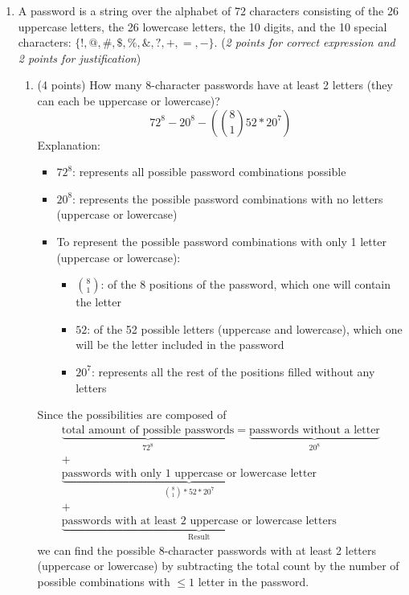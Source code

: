 \documentclass[10pt,letterpaper,unboxed,cm]{article}
\begin{document}
\begin{enumerate}
\item
A password is a string over the alphabet of 72 characters consisting of the 26 uppercase letters, the 26 lowercase letters, the 10 digits, and the 10 special characters: $\{!,@,\#,\$,\%,\&,?,+,=,-\}$. (\emph{2 points for correct expression and 2 points for justification})

\begin{enumerate}


\item
(4 points)
How many 8-character passwords have at least 2 letters (they can each be uppercase or lowercase)?
$$
    72^8-20^8-(\binom{8}{1}52*20^7)
$$
Explanation:
\begin{itemize}
    \item $72^8$: represents all possible password combinations possible
    \item $20^8$: represents the possible password combinations with no letters (uppercase or lowercase)
    \item To represent the possible password combinations with only 1 letter (uppercase or lowercase):
    \begin{itemize}
        \item $\binom{8}{1}$: of the 8 positions of the password, which one will contain the letter
        \item $52$: of the 52 possible letters (uppercase and lowercase), which one will be the letter included in the password
        \item $20^7$: represents all the rest of the positions filled without any letters
    \end{itemize}
\end{itemize}
Since the possibilities are composed of
\begin{align*}
\underbrace{\text{total amount of possible passwords}}_{72^8} = \underbrace{\text{passwords without a letter}}_{20^8}\\ 
+ \\
\underbrace{\text{passwords with only 1 uppercase or lowercase letter}}_{\binom{8}{1}*52*20^7}\\ 
+ \\
\underbrace{\text{passwords with at least 2 uppercase or lowercase letters}}_{\text{Result}}
\end{align*}
we can find the possible 8-character passwords with at least 2 letters (uppercase or lowercase) by subtracting the total count by the number of possible combinations with $\leq 1$ letter in the password.


\end{enumerate}
\end{enumerate}
\end{document}
